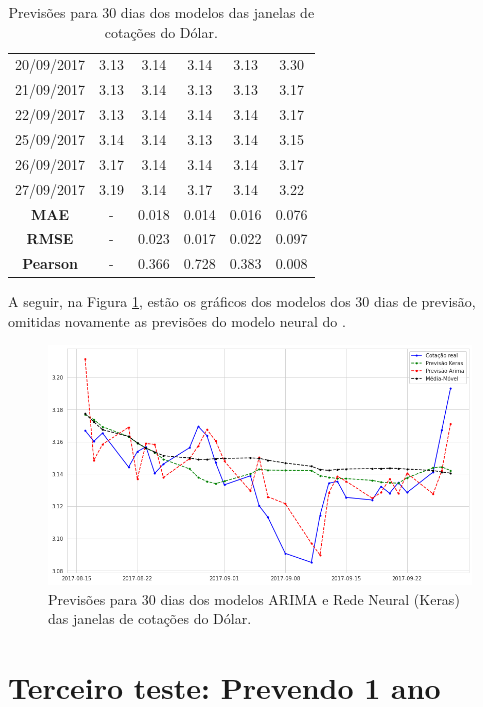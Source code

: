 \begin{table}[]
\begin{center}
\begin{tabular}{|c|c|c|c|c|c|}
20/09/2017 & 3.13 & 3.14 & 3.14 & 3.13 & 3.30 \\
21/09/2017 & 3.13 & 3.14 & 3.13 & 3.13 & 3.17 \\
22/09/2017 & 3.13 & 3.14 & 3.14 & 3.14 & 3.17 \\
25/09/2017 & 3.14 & 3.14 & 3.13 & 3.14 & 3.15 \\
26/09/2017 & 3.17 & 3.14 & 3.14 & 3.14 & 3.17 \\
27/09/2017 & 3.19 & 3.14 & 3.17 & 3.14 & 3.22 \\
\hline
\hline
\textbf{MAE} & - & 0.018 & 0.014 & 0.016 & 0.076 \\
\textbf{RMSE} & - & 0.023 & 0.017 & 0.022 & 0.097 \\
\textbf{Pearson} & - & 0.366 & 0.728 & 0.383 & 0.008 \\
\hline
\end{tabular}
\caption{Previsões para $30$ dias dos modelos das janelas de cotações do Dólar.}\label{tabela:teste_30}
\end{center}
\end{table}

A seguir, na Figura \ref{fig:previsoes_30}, estão os gráficos dos modelos dos $30$ dias de previsão, omitidas novamente as previsões do modelo neural do .

\begin{figure}[htb]
\centering
\includegraphics[width=15cm]{figuras/series_previsoes_30}
\caption{Previsões para $30$ dias dos modelos ARIMA e Rede Neural (Keras) das janelas de cotações do Dólar.}
\label{fig:previsoes_30}
\end{figure}


\section{Terceiro teste: Prevendo 1 ano}




